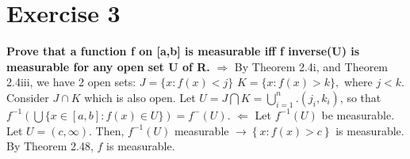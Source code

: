 \documentclass[paper=a4, fontsize=11pt]{scrartcl} %
\begin{document}
\section*{Exercise 3  }
\textbf{Prove that a function f on [a,b] is measurable iff f inverse(U) is measurable for any open set U of R.}
\newline
\newline
$\Rightarrow$
\newline
By Theorem 2.4i, and Theorem 2.4iii, we have 2 open sets:
\newline
$ J = \{ x:  f(x) <j \}$
\newline
$K = \{ x:  f(x) > k \} ,$ where $j<k$.
\newline
Consider $J \cap K$ which is also open.
\newline
Let $U = J \bigcap K = \bigcup_{i=1}^{n}. (j_i, k_i)$, so that $f^{-1} \left( \bigcup \{ x \in [a, b] : f(x) \in U  \} \right) = f^{-}(U)$. 
\newline
\newline
$\Leftarrow$
\newline
Let $f^{-1}(U)$ be measurable.
\newline
Let $U = \left( c, \infty \right)$.
\newline
Then, $f^{-1}(U)$ measurable $\rightarrow \left\{x: f(x) > c \right\}$ is measurable.
\newline
By Theorem 2.48, $f$ is measurable.
\end{document}
